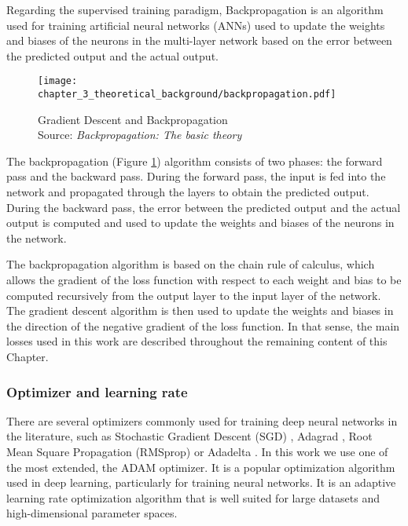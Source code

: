 Regarding the supervised training paradigm, Backpropagation \cite{rumelhart1995backpropagation} is an algorithm used for training artificial neural networks (ANNs) used to update the weights and biases of the neurons in the multi-layer network based on the error between the predicted output and the actual output.

\begin{figure}[h]
	\centering
	\texttt{[image: chapter\_3\_theoretical\_background/backpropagation.pdf]}
	\caption[Gradient Descent and Backpropagation]{Gradient Descent and Backpropagation \\ 
	Source: \textit{Backpropagation: The basic theory} \cite{rumelhart1995backpropagation}}
	\label{fig:chapter_3_theoretical_background/backpropagation}
\end{figure}

The backpropagation (Figure \ref{fig:chapter_3_theoretical_background/backpropagation}) algorithm consists of two phases: the forward pass and the backward pass. During the forward pass, the input is fed into the network and propagated through the layers to obtain the predicted output. During the backward pass, the error between the predicted output and the actual output is computed and used to update the weights and biases of the neurons in the network.

The backpropagation algorithm is based on the chain rule of calculus, which allows the gradient of the loss function with respect to each weight and bias to be computed recursively from the output layer to the input layer of the network. The gradient descent algorithm is then used to update the weights and biases in the direction of the negative gradient of the loss function. In that sense, the main losses used in this work are described throughout the remaining content of this Chapter.

\subsubsection{Optimizer and learning rate}
\label{subsubsec:3_optimizer_and_lr}

There are several optimizers commonly used for training deep neural networks in the literature, such as Stochastic Gradient Descent (SGD) \cite{robbins1951stochastic}, Adagrad \cite{duchi2011adaptive}, Root Mean Square Propagation (RMSprop) \cite{zou2019sufficient} or Adadelta \cite{zeiler2012adadelta}. In this work we use one of the most extended, the \ac{ADAM} \cite{kingma2014adam} optimizer. It is a popular optimization algorithm used in deep learning, particularly for training neural networks. It is an adaptive learning rate optimization algorithm that is well suited for large datasets and high-dimensional parameter spaces.

